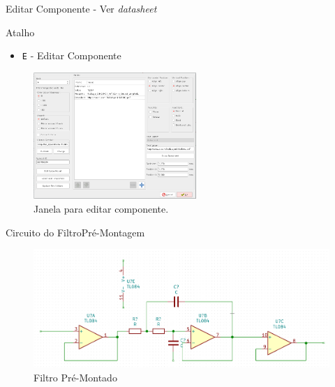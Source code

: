 \documentclass{beamer}
\begin{document}
\begin{frame}{Editar Componente - Ver \textit{datasheet}}
	\begin{block}{Atalho}
		\begin{itemize}
			\item \texttt{E} - Editar Componente
		\end{itemize}
	\end{block}
	\begin{figure}
		\centering
		\includegraphics[width=0.55\textwidth]{Imagens/1_1_editar_componente_datasheed.png}
		\caption{Janela para editar componente.}
	\end{figure}
\end{frame}

\begin{frame}{Circuito do Filtro}{Pré-Montagem}
	\begin{figure}
		\centering
		\includegraphics[width=1\textwidth]{Imagens/02_circuito_filtro_pre_montado.png}
		\caption{Filtro Pré-Montado}
	\end{figure}
\end{frame}
\end{document}
